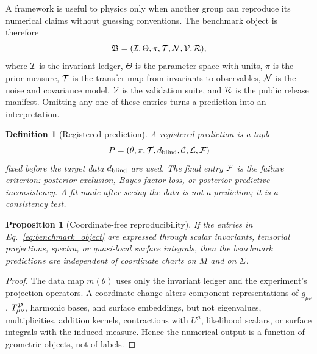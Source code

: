 \documentclass[
  aps,
  prd,
  reprint,
  superscriptaddress,
  nofootinbib,
  floatfix,
  longbibliography
]{revtex4-2}
\newtheorem{definition}{Definition}
\newtheorem{proposition}{Proposition}
\begin{document}
A framework is useful to physics only when another group can reproduce
its numerical claims without guessing conventions.  The benchmark object
is therefore
\begin{equation}
  {\mathfrak B}
  =
  ({\cal I},\Theta,\pi,{\cal T},{\cal N},{\cal V},{\cal R}),
  \label{eq:benchmark_object}
\end{equation}
where \({\cal I}\) is the invariant ledger, \(\Theta\) is the parameter
space with units, \(\pi\) is the prior measure, \({\cal T}\) is the
transfer map from invariants to observables, \({\cal N}\) is the noise
and covariance model, \({\cal V}\) is the validation suite, and
\({\cal R}\) is the public release manifest.  Omitting any one of these
entries turns a prediction into an interpretation.

\begin{definition}[Registered prediction]
A registered prediction is a tuple
\begin{equation}
  P=(\theta,\pi,{\cal T},d_{\rm blind},{\cal C},{\cal L},{\cal F})
  \label{eq:registered_prediction}
\end{equation}
fixed before the target data \(d_{\rm blind}\) are used.  The final
entry \({\cal F}\) is the failure criterion: posterior exclusion,
Bayes-factor loss, or posterior-predictive inconsistency.  A fit made
after seeing the data is not a prediction; it is a consistency test.
\end{definition}

\begin{proposition}[Coordinate-free reproducibility]
If the entries in Eq.~\eqref{eq:benchmark_object} are expressed through
scalar invariants, tensorial projections, spectra, or quasi-local
surface integrals, then the benchmark predictions are independent of
coordinate charts on \(M\) and on \(\Sigma\).
\end{proposition}

\begin{proof}
The data map \(m(\theta)\) uses only the invariant ledger and the
experiment's projection operators.  A coordinate change alters component
representations of \(g_{\mu\nu}\), \(T^{\cal D}_{\mu\nu}\), harmonic
bases, and surface embeddings, but not eigenvalues, multiplicities,
addition kernels, contractions with \(U^\mu\), likelihood scalars, or
surface integrals with the induced measure.  Hence the numerical output
is a function of geometric objects, not of labels.
\end{proof}
\end{document}
